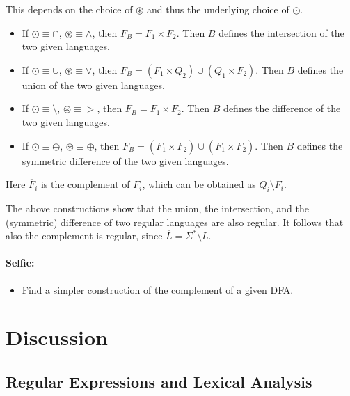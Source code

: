 This depends on the choice of $\circledast$ and thus the underlying choice of $\odot$.
\begin{itemize}
\item If $\odot \equiv \cap$, $\circledast \equiv \wedge$, then $F_B = F_1
      \times F_2$. Then $B$ defines the intersection of the two given languages.
\item If $\odot \equiv \cup$, $\circledast \equiv \vee$, 
      then $F_B = (F_1 \times Q_2) \cup (Q_1 \times F_2)$. 
      Then $B$ defines the union of the two given languages.
\item If $\odot \equiv \setminus$, $\circledast \equiv >$, 
      then $F_B = F_1 \times \overline{F}_2$.
      Then $B$ defines the difference of the two given languages.
\item If $\odot \equiv \ominus$, $\circledast \equiv \oplus$, 
      then $F_B = (F_1 \times \overline{F}_2) \cup (\overline{F}_1 \times F_2)$.
      Then $B$ defines the symmetric difference of the two given languages.
\end{itemize}
Here $\overline{F}_i$ is the complement of $F_i$, which can be obtained as
$Q_i\setminus F_i$.

The above constructions show that the union, the intersection, and the
(symmetric) difference of two regular languages are also regular. It
follows that also the complement is regular, since
%
$\overline{L} = \Sigma^* \setminus L$.

\paragraph{Selfie:}
\begin{itemize}
\item[]
Find a simpler construction of the complement of a given DFA.

\end{itemize}

\section{Discussion}

\subsection{Regular Expressions and Lexical Analysis}

